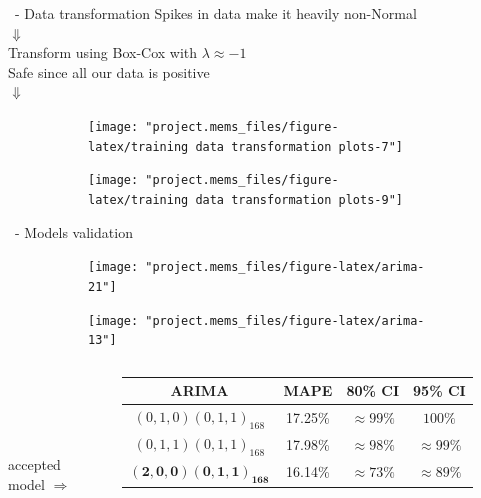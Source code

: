 \documentclass{beamer}
\begin{document}
\begin{frame}{\subsecname~- Data transformation}\centering
	Spikes in data make it heavily non-Normal\\$\Downarrow$\\
	Transform using Box-Cox with $\lambda\approx-1$\\ %
	\vspace{.5em}\small Safe since all our data is positive\\\vspace{1em}\large$\Downarrow$\vspace{.5em}\\
	\begin{figure}
		\begin{subfigure}{.45\linewidth}
			\texttt{[image: "project.mems\_files/figure-latex/training data transformation plots-7"]}
		\end{subfigure}
		\begin{subfigure}{.45\linewidth}
			\texttt{[image: "project.mems\_files/figure-latex/training data transformation plots-9"]}
		\end{subfigure}
	\end{figure}
\end{frame}

\begin{frame}{\subsecname~- Models validation}
	\begin{figure}
		\begin{subfigure}{.45\linewidth}
			\texttt{[image: "project.mems\_files/figure-latex/arima-21"]}
		\end{subfigure}
		\begin{subfigure}{.45\linewidth}
			\texttt{[image: "project.mems\_files/figure-latex/arima-13"]}
		\end{subfigure}
	\end{figure}
	\begin{columns}[T]
		\raggedleft~\\~\\~\\~\\\vspace{1em}accepted model $\Rightarrow$ \hspace{-1.5em}
		\begin{table}
			\begin{tabular}{c | c c c}
				\textbf{ARIMA} & MAPE   & 80\% CI & 95\% CI \\
				\midrule
				$(0,1,0)(0,1,1)_{168}$ & 17.25\% & $\approx99\%$ & $100\%$ \\
				$(0,1,1)(0,1,1)_{168}$ & 17.98\% & $\approx98\%$ & $\approx99\%$ \\
				$\mathbf{(2,0,0)(0,1,1)_{168}}$ & 16.14\% & $\approx73\%$ & $\approx89\%$ \\
			\end{tabular}
		\end{table}
	\end{columns}
\end{frame}
\end{document}
